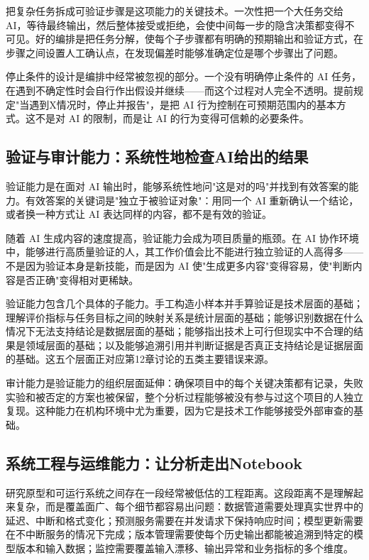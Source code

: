 把复杂任务拆成可验证步骤是这项能力的关键技术。一次性把一个大任务交给 AI，等待最终输出，然后整体接受或拒绝，会使中间每一步的隐含决策都变得不可见。好的编排是把任务分解，使每个子步骤都有明确的预期输出和验证方式，在步骤之间设置人工确认点，在发现偏差时能够准确定位是哪个步骤出了问题。

停止条件的设计是编排中经常被忽视的部分。一个没有明确停止条件的 AI 任务，在遇到不确定性时会自行作出假设并继续——而这个过程对人完全不透明。提前规定"当遇到X情况时，停止并报告"，是把 AI 行为控制在可预期范围内的基本方式。这不是对 AI 的限制，而是让 AI 的行为变得可信赖的必要条件。

\subsection{验证与审计能力：系统性地检查AI给出的结果}

验证能力是在面对 AI 输出时，能够系统性地问"这是对的吗"并找到有效答案的能力。有效答案的关键词是"独立于被验证对象"：用同一个 AI 重新确认一个结论，或者换一种方式让 AI 表达同样的内容，都不是有效的验证。

随着 AI 生成内容的速度提高，验证能力会成为项目质量的瓶颈。在 AI 协作环境中，能够进行高质量验证的人，其工作价值会比不能进行独立验证的人高得多——不是因为验证本身是新技能，而是因为 AI 使"生成更多内容"变得容易，使"判断内容是否正确"变得相对更稀缺。

验证能力包含几个具体的子能力。手工构造小样本并手算验证是技术层面的基础；理解评价指标与任务目标之间的映射关系是统计层面的基础；能够识别数据在什么情况下无法支持结论是数据层面的基础；能够指出技术上可行但现实中不合理的结果是领域层面的基础；以及能够追溯引用并判断证据是否真正支持结论是证据层面的基础。这五个层面正对应第12章讨论的五类主要错误来源。

审计能力是验证能力的组织层面延伸：确保项目中的每个关键决策都有记录，失败实验和被否定的方案也被保留，整个分析过程能够被没有参与过这个项目的人独立复现。这种能力在机构环境中尤为重要，因为它是技术工作能够接受外部审查的基础。

\subsection{系统工程与运维能力：让分析走出Notebook}

研究原型和可运行系统之间存在一段经常被低估的工程距离。这段距离不是理解起来复杂，而是覆盖面广、每个细节都容易出问题：数据管道需要处理真实世界中的延迟、中断和格式变化；预测服务需要在并发请求下保持响应时间；模型更新需要在不中断服务的情况下完成；版本管理需要使每个历史输出都能被追溯到特定的模型版本和输入数据；监控需要覆盖输入漂移、输出异常和业务指标的多个维度。

